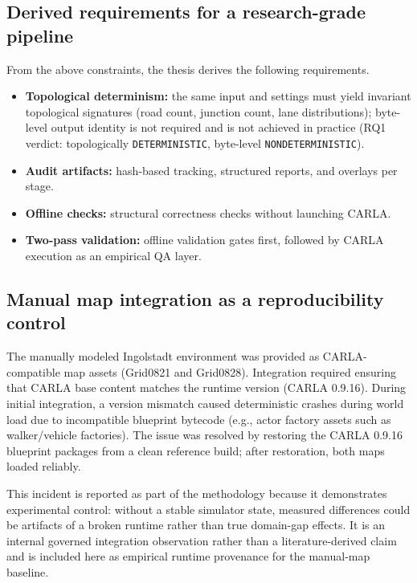 \subsection{Derived requirements for a research-grade pipeline}
From the above constraints, the thesis derives the following requirements.
\begin{itemize}
\item \textbf{Topological determinism:} the same input and settings must yield invariant topological signatures (road count, junction count, lane distributions); byte-level output identity is not required and is not achieved in practice (RQ1 verdict: topologically \texttt{DETERMINISTIC}, byte-level \texttt{NONDETERMINISTIC}).
\item \textbf{Audit artifacts:} hash-based tracking, structured reports, and overlays per stage.
\item \textbf{Offline checks:} structural correctness checks without launching CARLA.
\item \textbf{Two-pass validation:} offline validation gates first, followed by CARLA execution as an empirical QA layer.
\end{itemize}


\subsection{Manual map integration as a reproducibility control}
\label{sec:manual_map_integration}
The manually modeled Ingolstadt environment was provided as CARLA-compatible map assets (Grid0821 and Grid0828).
Integration required ensuring that CARLA base content matches the runtime version (CARLA 0.9.16).
During initial integration, a version mismatch caused deterministic crashes during world load due to incompatible blueprint bytecode (e.g., actor factory assets such as walker/vehicle factories).
The issue was resolved by restoring the CARLA 0.9.16 blueprint packages from a clean reference build; after restoration, both maps loaded reliably.

This incident is reported as part of the methodology because it demonstrates experimental control: without a stable simulator state, measured differences could be artifacts of a broken runtime rather than true domain-gap effects. It is an internal governed integration observation rather than a literature-derived claim and is included here as empirical runtime provenance for the manual-map baseline.


